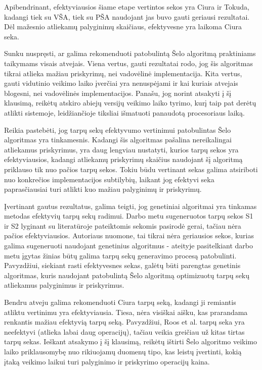 \documentclass{VUMIFInfKursinis}
\begin{document}
Apibendrinant, efektyviausios šiame etape vertintos sekos yra Ciura ir Tokuda, kadangi tiek su VŠA, tiek su PŠA 
naudojant jas buvo gauti geriausi rezultatai.
Dėl mažesnio atliekamų palyginimų skaičiaus, efektyvesne yra laikoma Ciura seka.


Sunku nuspręsti, ar galima rekomenduoti patobulintą Šelo algoritmą praktiniams taikymams visais atvejais. 
Viena vertus, gauti rezultatai rodo, jog šis algoritmas tikrai atlieka mažiau priskyrimų, nei vadovėlinė implementacija.
Kita vertus, gauti vidutinio veikimo laiko įverčiai yra nenuspėjami ir kai kuriais atvejais blogesni, nei vadovėlinės implementacijos.
Panašu, jog norint atsakyti į šį klausimą, reikėtų atskiro abiejų versijų veikimo laiko tyrimo, kurį taip pat derėtų atlikti sistemoje, leidžiančioje tiksliai išmatuoti
panaudotą procesoriaus laiką.

Reikia pastebėti, jog tarpų sekų efektyvumo vertinimui patobulintas Šelo algoritmas yra tinkamesnis.
Kadangi šis algoritmas pašalina nereikalingai atliekamus priskyrimus, yra daug lengviau nustatyti, kurios tarpų sekos yra efektyviausios,
kadangi atliekamų priskyrimų skaičius naudojant šį algoritmą priklauso tik nuo pačios tarpų sekos.
Tokiu būdu vertinant sekas galima atsiriboti nuo konkrečios implementacijos subtilybių, laikant jog efektyvi seka paprasčiausiai turi atlikti kuo mažiau palyginimų ir priskyrimų.

Įvertinant gautus rezultatus, galima teigti, jog genetiniai algoritmai yra tinkamas metodas efektyvių tarpų sekų radimui.
Darbo metu sugeneruotos tarpų sekos S1 ir S2 lyginant su literatūroje pateiktomis sekomis pasirodė gerai, tačiau nėra pačios efektyviausios.
Autoriaus nuomone, tai tikrai nėra geriausios sekos, kurias galima sugeneruoti naudojant genetinius algoritmus - ateityje
pasitelkiant darbo metu įgytas žinias būtų galima tarpų sekų generavimo procesą patobulinti.
Pavyzdžiui, siekiant rasti efektyvesnes sekas, galėtų būti parengtas genetinis algoritmas, kuris naudojant patobulintą Šelo algoritmą
optimizuotų tarpų sekų atliekamus palyginimus ir priskyrimus.

Bendru atveju galima rekomenduoti Ciura tarpų seką, kadangi ji remiantis atliktu vertinimu yra efektyviausia.
Tiesa, nėra visiškai aišku, kas prarandama renkantis mažiau efektyvią tarpų seką.
Pavyzdžiui, Roos et al. tarpų seka yra neefektyvi (atlieka labai daug operacijų), tačiau veikia greičiau už kitas tirtas tarpų sekas.
Ieškant atsakymo į šį klausimą, reikėtų ištirti Šelo algoritmo veikimo laiko priklausomybę nuo rikiuojamų duomenų tipo,
kas leistų įvertinti, kokią įtaką veikimo laikui turi palyginimo ir priskyrimo operacijų kaina.
\end{document}

